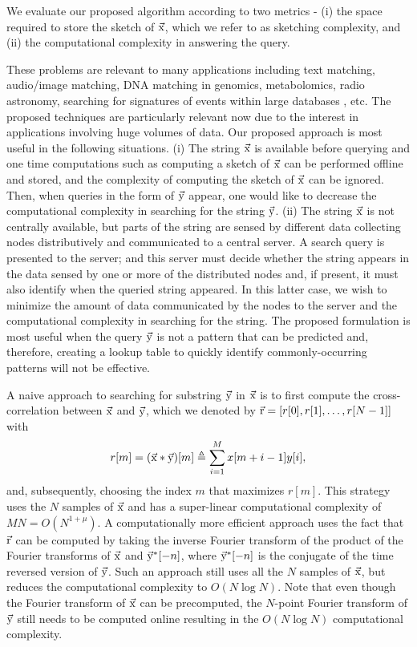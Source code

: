 We evaluate our proposed algorithm according to two metrics - (i) the space required to store the sketch of $\vec{\mathrm{x}}$, which we refer to as sketching complexity, and (ii) the computational complexity in answering the query.

These problems are relevant to many applications including text matching, audio/image matching, DNA matching in genomics, metabolomics, radio astronomy, searching for signatures of events within large databases \cite{rakthanmanon2012searching}, etc. The proposed techniques are particularly relevant now due to the interest in applications involving huge volumes of data. 
 Our proposed approach is most useful in the following situations.
(i) The string $\vec{\mathrm{x}}$ is available before querying and one time computations such as computing a sketch of $\vec{\mathrm{x}}$ can be performed offline and stored, and the complexity of computing the sketch of $\vec{\mathrm{x}}$ can be ignored. Then, when queries in the form of $\vec{\mathrm{y}}$ appear, one would like to decrease the computational complexity in searching for the string $\vec{\mathrm{y}}$. (ii) The string $\vec{\mathrm{x}}$ is not centrally available, but parts of the string are sensed by different data collecting nodes distributively and communicated to a central server. A search query is presented to the server; and this server must decide whether the string appears in the data sensed by one or more of the distributed nodes and, if present, it must also identify when the queried string appeared.
In this latter case, we wish to minimize the amount of data communicated by the nodes to the server and the computational complexity in searching for the string.
The proposed formulation is most useful when the query $\vec{\mathrm{y}}$ is not a pattern that can be predicted and, therefore, creating a lookup table to quickly identify commonly-occurring patterns will not be effective.

A naive approach to searching for substring $\vec{\mathrm{y}}$ in $\vec{\mathrm{x}}$ is to first compute the cross-correlation between $\vec{\mathrm{x}}$ and $\vec{\mathrm{y}}$, which we denoted by $\vec{\mathrm{r}}=[r[0], r[1],\ldots, r[N-1]]$ with
\begin{align}
\label{Eqn:DefCrossCorrelation}
r[m]=(\vec{\mathrm{x}}*\vec{\mathrm{y}})[m] \triangleq \sum_{i=1}^{M} x[m+i-1] y[i] ,
\end{align}
and, subsequently,  choosing the index $m$ that maximizes $r[m]$.
This strategy uses the $N$ samples of $\vec{\mathrm{x}}$ and has a super-linear computational complexity of $MN = O(N^{1+\mu})$. A computationally more efficient approach uses the fact that $\vec{\mathrm{r}}$ can be computed by taking the inverse Fourier transform of the product of the Fourier transforms of $\vec{\mathrm{x}}$ and $ \vec{\mathrm{y}}^*[-n]$, where $\vec{\mathrm{y}}^*[-n]$ is the conjugate of the time reversed version of $\vec{\mathrm{y}}$.
Such an approach still uses all the $N$ samples of $\vec{\mathrm{x}}$, but reduces the computational complexity to $O(N \log N)$. Note that even though the Fourier transform of $\vec{\mathrm{x}}$ can be precomputed, the $N$-point Fourier transform of $\vec{\mathrm{y}}$ still needs to be computed online resulting in the $O(N \log N)$ computational complexity.

